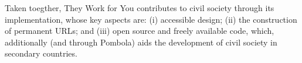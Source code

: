 Taken toegther, They Work for You contributes to civil society through its implementation, whose key aspects are: (i) accessible design; (ii) the construction of permanent URLs; and (iii) open source and freely available code, which, additionally (and through Pombola) aids the development of civil society in secondary countries.
